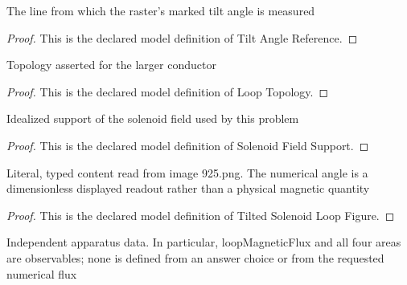 \begin{definition}
  \label{def:physics:phyx-mini-0925:phyxminiproblems-problemphyxmini0925-tiltanglereference}
  The line from which the raster's marked tilt angle is measured
\end{definition}
\begin{proof}
  This is the declared model definition of Tilt Angle Reference.
\end{proof}
\begin{definition}
  \label{def:physics:phyx-mini-0925:phyxminiproblems-problemphyxmini0925-looptopology}
  Topology asserted for the larger conductor
\end{definition}
\begin{proof}
  This is the declared model definition of Loop Topology.
\end{proof}
\begin{definition}
  \label{def:physics:phyx-mini-0925:phyxminiproblems-problemphyxmini0925-solenoidfieldsupport}
  Idealized support of the solenoid field used by this problem
\end{definition}
\begin{proof}
  This is the declared model definition of Solenoid Field Support.
\end{proof}
\begin{definition}
  \label{def:physics:phyx-mini-0925:phyxminiproblems-problemphyxmini0925-tiltedsolenoidloopfigure}
  Literal, typed content read from image 925.png. The numerical angle is a dimensionless displayed readout rather than a physical magnetic quantity
\end{definition}
\begin{proof}
  This is the declared model definition of Tilted Solenoid Loop Figure.
\end{proof}
\begin{definition}
  \label{def:physics:phyx-mini-0925:phyxminiproblems-problemphyxmini0925-tiltedsolenoidloopsetup}
  Independent apparatus data. In particular, loopMagneticFlux and all four areas are observables; none is defined from an answer choice or from the requested numerical flux
\end{definition}
